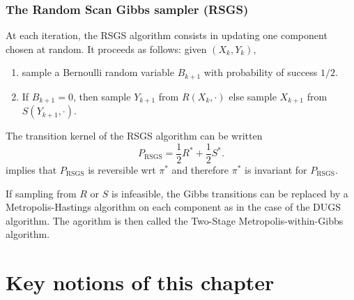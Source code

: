 \documentclass[english,graybox,envcountchap,envcountsame,sectrefs,shortlabels]{svmono}
\theoremstyle{style}
\newcommand{\eqsp}{}
\begin{document}
\subsubsection*{The Random Scan Gibbs sampler (RSGS)}
 
At each iteration, the RSGS algorithm consists in updating one component chosen at random. It
proceeds as follows: given $(X_k,Y_k)$,
\begin{enumerate}[label=(RSGS\arabic*)]
\item \label{item:rsgs-gibbs-0} sample a Bernoulli random variable $B_{k+1}$ with probability of
  success $1/2$.
\item \label{item:rsgs-gibbs-1} If $B_{k+1}= 0$, then sample $Y_{k+1}$ from $R(X_k,\cdot)$ else
  sample $X_{k+1}$ from $S(Y_{k+1},\cdot)$.
\end{enumerate}
The transition kernel of the RSGS algorithm can be written
\begin{equation}
  \label{eq:kernel:RSGS}
  P_{\mathrm{RSGS}}= \frac{1}{2} R^* + \frac{1}{2} S^* \eqsp.
\end{equation}
 implies that $P_{\mathrm{RSGS}}$ is reversible wrt
$\pi^*$ and therefore  $\pi^*$ is invariant for $P_{\mathrm{RSGS}}$.

If sampling from $R$ or $S$ is infeasible, the Gibbs transitions can be replaced by a
Metropolis-Hastings algorithm on each component as in the case of the DUGS algorithm. The agorithm
is then called the Two-Stage Metropolis-within-Gibbs algorithm.


\section{Key notions of this chapter}
\begin{center}
\end{center}
\end{document}
